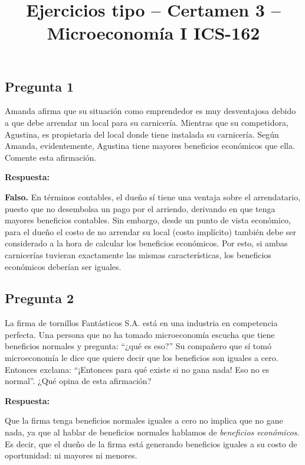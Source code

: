 \documentclass[12pt,letterpaper]{article}
\title{\textbf{Ejercicios tipo -- Certamen 3 -- Microeconomía I ICS-162}}
\date{}
\begin{document}
\maketitle



\subsection*{Pregunta 1}

Amanda afirma que su situación como emprendedor es muy desventajosa debido a que debe arrendar un local para su carnicería. Mientras que su competidora, Agustina, es propietaria del local donde tiene instalada su carnicería. Según Amanda, evidentemente, Agustina tiene mayores beneficios económicos que ella. Comente esta afirmación.

\medskip
\textbf{Respuesta:}

\textbf{Falso.} En términos contables, el dueño sí tiene una ventaja sobre el arrendatario, puesto que no desembolsa un pago por el arriendo, derivando en que tenga mayores beneficios contables. Sin embargo, desde un punto de vista económico, para el dueño el costo de no arrendar su local (costo implícito) también debe ser considerado a la hora de calcular los beneficios económicos. Por esto, si ambas carnicerías tuvieran exactamente las mismas características, los beneficios económicos deberían ser iguales.

\subsection*{Pregunta 2}

La firma de tornillos Fantásticos S.A. está en una industria en competencia perfecta. Una persona que no ha tomado microeconomía escucha que tiene beneficios normales y pregunta: ``¿qué es eso?'' Su compañero que sí tomó microeconomía le dice que quiere decir que los beneficios son iguales a cero. Entonces exclama: ``¡Entonces para qué existe si no gana nada! Eso no es normal''. ¿Qué opina de esta afirmación?

\medskip
\textbf{Respuesta:}

Que la firma tenga beneficios normales iguales a cero no implica que no gane nada, ya que al hablar de beneficios normales hablamos de \textit{beneficios económicos}. Es decir, que el dueño de la firma está generando beneficios iguales a su costo de oportunidad: ni mayores ni menores.
\end{document}
